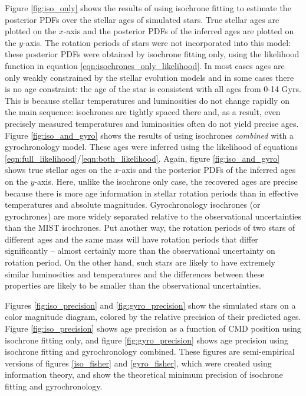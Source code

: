 Figure \ref{fig:iso_only} shows the results of using isochrone fitting
to estimate the posterior PDFs over the stellar ages of simulated stars.
True stellar ages are plotted on the $x$-axis and the posterior PDFs of the
inferred ages are plotted on the $y$-axis.
The rotation periods of stars were not incorporated into this model: these
posterior PDFs were obtained by isochrone fitting only, using the likelihood
function in equation \eqref{eqn:isochrones_only_likelihood}.
In most cases ages are only weakly constrained by the stellar evolution models
and in some cases there is no age constraint: the age of the star is
consistent with all ages from 0-14 Gyrs.
This is because stellar temperatures and luminosities do not change rapidly on
the main sequence: isochrones are tightly spaced there and, as a result, even
precisely measured temperatures and luminosities often do not yield precise
ages.
Figure \ref{fig:iso_and_gyro} shows the results of using isochrones {\it
combined} with a gyrochronology model.
These ages were inferred using the likelihood of equations
\eqref{eqn:full_likelihood}/\eqref{eqn:both_likelihood}.
Again, figure \ref{fig:iso_and_gyro} shows true stellar ages on the $x$-axis
and the posterior PDFs of the inferred ages on the $y$-axis.
Here, unlike the isochrone only case, the recovered ages are precise because
there is more age information in stellar rotation periods than in effective
temperatures and absolute magnitudes.
Gyrochronology isochrones (or gyrochrones) are more widely separated relative
to the observational uncertainties than the MIST isochrones.
Put another way, the rotation periods of two stars of different ages and the
same mass will have rotation periods that differ significantly -- almost
certainly more than the observational uncertainty on rotation period.
On the other hand, such stars are likely to have extremely similar
luminosities and temperatures and the differences between these properties are
likely to be smaller than the observational uncertainties.

Figures \ref{fig:iso_precision} and \ref{fig:gyro_precision} show the
simulated stars on a color magnitude diagram, colored by the relative
precision of their predicted ages.
Figure \ref{fig:iso_precision} shows age precision as a function of CMD
position using isochrone fitting only, and figure \ref{fig:gyro_precision}
shows age precision using isochrone fitting and gyrochronology combined.
These figures are semi-empirical versions of figures \ref{iso_fisher} and
\ref{gyro_fisher}, which were created using information theory, and show the
theoretical minimum precision of isochrone fitting and gyrochronology.

